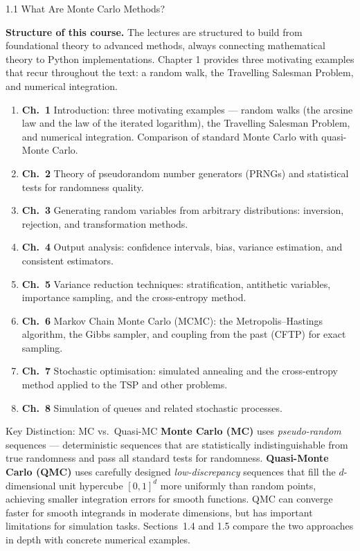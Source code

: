 \documentclass[aspectratio=169,10pt]{beamer}
\begin{document}
\begin{frame}[allowframebreaks]{1.1 What Are Monte Carlo Methods?}
  \framebreak

  \textbf{Structure of this course.}  The lectures are structured to build from
  foundational theory to advanced methods, always connecting mathematical
  theory to Python implementations.  Chapter 1 provides three motivating
  examples that recur throughout the text: a random walk, the Travelling
  Salesman Problem, and numerical integration.

  \begin{enumerate}
    \item \textbf{Ch.~1} Introduction: three motivating examples ---
      random walks (the arcsine law and the law of the iterated logarithm),
      the Travelling Salesman Problem, and numerical integration.  Comparison
      of standard Monte Carlo with quasi-Monte Carlo.
    \item \textbf{Ch.~2} Theory of pseudorandom number generators (PRNGs) and
      statistical tests for randomness quality.
    \item \textbf{Ch.~3} Generating random variables from arbitrary
      distributions: inversion, rejection, and transformation methods.
    \item \textbf{Ch.~4} Output analysis: confidence intervals, bias,
      variance estimation, and consistent estimators.
    \item \textbf{Ch.~5} Variance reduction techniques: stratification,
      antithetic variables, importance sampling, and the cross-entropy method.
    \item \textbf{Ch.~6} Markov Chain Monte Carlo (MCMC): the
      Metropolis--Hastings algorithm, the Gibbs sampler, and coupling from
      the past (CFTP) for exact sampling.
    \item \textbf{Ch.~7} Stochastic optimisation: simulated annealing and
      the cross-entropy method applied to the TSP and other problems.
    \item \textbf{Ch.~8} Simulation of queues and related stochastic processes.
  \end{enumerate}

  \begin{alertblock}{Key Distinction: MC vs.\ Quasi-MC}
    \textbf{Monte Carlo (MC)} uses \emph{pseudo-random} sequences ---
    deterministic sequences that are statistically indistinguishable from true
    randomness and pass all standard tests for randomness.
    \textbf{Quasi-Monte Carlo (QMC)} uses carefully designed \emph{low-discrepancy}
    sequences that fill the $d$-dimensional unit hypercube $[0,1]^d$ more
    uniformly than random points, achieving smaller integration errors for smooth
    functions.  QMC can converge faster for smooth integrands in moderate
    dimensions, but has important limitations for simulation tasks.
    Sections~1.4 and 1.5 compare the two approaches in depth with concrete
    numerical examples.
  \end{alertblock}

\end{frame}
\end{document}
